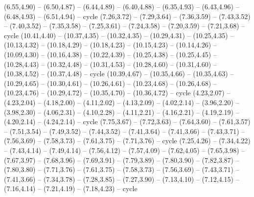 \expandafter\def\csname geo:gebiet:CZE\endcsname{
  (6.55,4.90) -- (6.50,4.87) -- (6.44,4.89) -- (6.40,4.88) -- (6.35,4.93) -- (6.43,4.96) -- (6.48,4.93) -- (6.51,4.94) -- cycle}
\expandafter\def\csname geo:gebiet:ERI\endcsname{
  (7.26,3.72) -- (7.29,3.64) -- (7.36,3.59) -- (7.43,3.52) -- (7.40,3.52) -- (7.35,3.58) -- (7.25,3.61) -- (7.24,3.58) -- (7.20,3.59) -- (7.21,3.68) -- cycle}
\expandafter\def\csname geo:gebiet:JPN\endcsname{
  (10.41,4.40) -- (10.37,4.35) -- (10.32,4.35) -- (10.29,4.31) -- (10.25,4.35) -- (10.13,4.32) -- (10.18,4.29) -- (10.18,4.23) -- (10.15,4.23) -- (10.14,4.26) -- (10.09,4.30) -- (10.16,4.38) -- (10.22,4.39) -- (10.25,4.38) -- (10.25,4.45) -- (10.28,4.43) -- (10.32,4.48) -- (10.31,4.53) -- (10.28,4.60) -- (10.31,4.60) -- (10.38,4.52) -- (10.37,4.48) -- cycle
  (10.39,4.67) -- (10.35,4.66) -- (10.35,4.63) -- (10.29,4.65) -- (10.30,4.61) -- (10.26,4.61) -- (10.23,4.68) -- (10.26,4.68) -- (10.23,4.76) -- (10.29,4.72) -- (10.35,4.70) -- (10.36,4.72) -- cycle}
\expandafter\def\csname geo:gebiet:PRY\endcsname{
  (4.23,2.07) -- (4.23,2.04) -- (4.18,2.00) -- (4.11,2.02) -- (4.13,2.09) -- (4.02,2.14) -- (3.96,2.20) -- (3.98,2.30) -- (4.06,2.31) -- (4.10,2.28) -- (4.11,2.21) -- (4.16,2.21) -- (4.19,2.19) -- (4.20,2.14) -- (4.24,2.14) -- cycle}
\expandafter\def\csname geo:gebiet:YEM\endcsname{
  (7.75,3.67) -- (7.72,3.63) -- (7.64,3.60) -- (7.61,3.57) -- (7.51,3.54) -- (7.49,3.52) -- (7.44,3.52) -- (7.41,3.64) -- (7.41,3.66) -- (7.43,3.71) -- (7.56,3.69) -- (7.58,3.73) -- (7.61,3.75) -- (7.71,3.76) -- cycle}
\expandafter\def\csname geo:gebiet:SAU\endcsname{
  (7.25,4.26) -- (7.34,4.22) -- (7.43,4.14) -- (7.49,4.14) -- (7.56,4.12) -- (7.57,4.09) -- (7.62,4.05) -- (7.65,3.98) -- (7.67,3.97) -- (7.68,3.96) -- (7.69,3.91) -- (7.79,3.89) -- (7.80,3.90) -- (7.82,3.87) -- (7.80,3.80) -- (7.71,3.76) -- (7.61,3.75) -- (7.58,3.73) -- (7.56,3.69) -- (7.43,3.71) -- (7.41,3.66) -- (7.34,3.78) -- (7.28,3.85) -- (7.27,3.90) -- (7.13,4.10) -- (7.12,4.15) -- (7.16,4.14) -- (7.21,4.19) -- (7.18,4.23) -- cycle}
